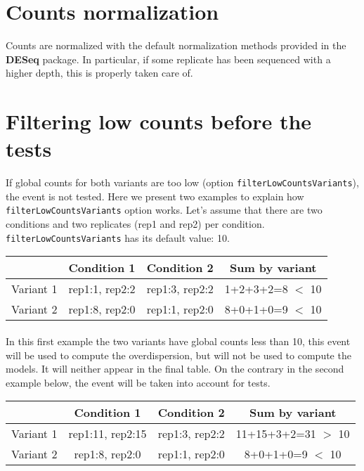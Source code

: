 \documentclass[english, a4paper, 12pt]{article}
\begin{document}
\section{Counts normalization}
Counts are normalized with the default normalization methods provided in the \textbf{DESeq} package. In particular, if some replicate has been sequenced with a higher depth, this is properly taken care of.

\section{Filtering low counts before the tests}
 If global counts for both variants are too low (option \texttt{filterLowCountsVariants}), the event is not tested.
Here we present two examples to explain how \texttt{filterLowCountsVariants} option works. Let's assume that there are two conditions and two replicates (rep1 and rep2) per condition. \texttt{filterLowCountsVariants} has its default value: 10.\\

\begin{tabular}{r|c|c|c}
  \hline
   & Condition 1 & Condition 2& Sum by variant \\
  \hline
  Variant 1 &	rep1:1, rep2:2 & rep1:3, rep2:2& 1+2+3+2=8 $<$ 10  \\
 Variant 2 &	rep1:8, rep2:0 & rep1:1, rep2:0& 8+0+1+0=9 $<$ 10 \\
  \hline
\end{tabular}
\paragraph{}In this first example the two variants have global counts less than 10, this event will be used to compute the overdispersion, but will not be used to compute the models. It will neither appear in the final table. On the contrary in the second example below, the event will be taken into account for tests.\\

\begin{tabular}{r|c|c|c}
  \hline
   & Condition 1 & Condition 2& Sum by variant \\
  \hline
  Variant 1 &	rep1:11, rep2:15 & rep1:3, rep2:2&  11+15+3+2=31 $>$ 10 \\
 Variant 2 &	rep1:8, rep2:0 & rep1:1, rep2:0& 8+0+1+0=9 $<$ 10 \\
  \hline
\end{tabular}
\end{document}
